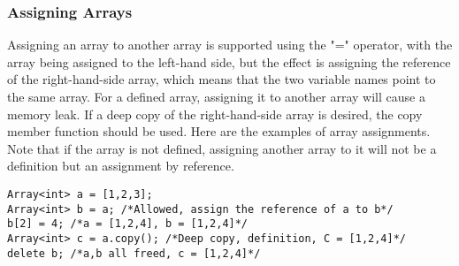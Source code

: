 \subsubsection{Assigning Arrays}
Assigning an array to another array is supported using the "=" operator, with the array being assigned to the left-hand side, but the effect is assigning the reference of the right-hand-side array, which means that the two variable names point to the same array. For a defined array, assigning it to another array will cause a memory leak. If a deep copy of the right-hand-side array is desired, the copy member function should be used. Here are the examples of array assignments. Note that if the array is not defined, assigning another array to it will not be a definition but an assignment by reference.
\begin{lstlisting}[caption={array\_delete.csm}, captionpos=b]
Array<int> a = [1,2,3];
Array<int> b = a; /*Allowed, assign the reference of a to b*/
b[2] = 4; /*a = [1,2,4], b = [1,2,4]*/
Array<int> c = a.copy(); /*Deep copy, definition, C = [1,2,4]*/
delete b; /*a,b all freed, c = [1,2,4]*/

\end{lstlisting}